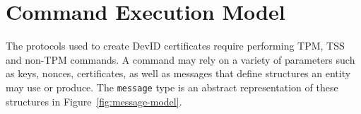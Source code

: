 \documentclass[runningheads]{llncs}
\begin{document}

%
%
%
\section{Command Execution Model}

The protocols used to create DevID certificates require performing
TPM, TSS and non-TPM commands. A command may rely on a variety of
parameters such as keys, nonces, certificates, as well as messages
that define structures an entity may use or produce. The
\verb|message| type is an abstract representation of these structures
in Figure~\ref{fig:message-model}.
\end{document}
